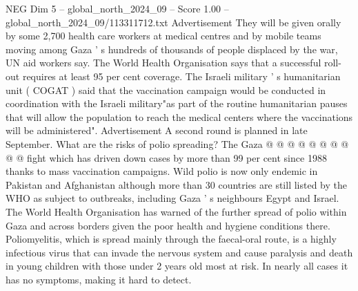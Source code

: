 \begin{textsample}{NEG Dim 5 – global\_north\_2024\_09 – Score 1.00 – global\_north\_2024\_09/113311712.txt}
Advertisement They will be given orally by some 2,700 health care workers at medical centres and by mobile teams moving among Gaza ' s hundreds of thousands of people displaced by the war, UN aid workers say.
The World Health Organisation says that a successful roll-out requires at least 95 per cent coverage.
The Israeli military ' s humanitarian unit ( COGAT ) said that the vaccination campaign would be conducted in coordination with the Israeli military"as part of the routine humanitarian pauses that will allow the population to reach the medical centers where the vaccinations will be administered".
Advertisement A second round is planned in late September.
What are the risks of polio spreading?
The Gaza @ @ @ @ @ @ @ @ @ @ fight which has driven down cases by more than 99 per cent since 1988 thanks to mass vaccination campaigns.
Wild polio is now only endemic in Pakistan and Afghanistan although more than 30 countries are still listed by the WHO as subject to outbreaks, including Gaza ' s neighbours Egypt and Israel.
The World Health Organisation has warned of the further spread of polio within Gaza and across borders given the poor health and hygiene conditions there.
Poliomyelitis, which is spread mainly through the faecal-oral route, is a highly infectious virus that can invade the nervous system and cause paralysis and death in young children with those under 2 years old most at risk.
In nearly all cases it has no symptoms, making it hard to detect.

\end{textsample}
